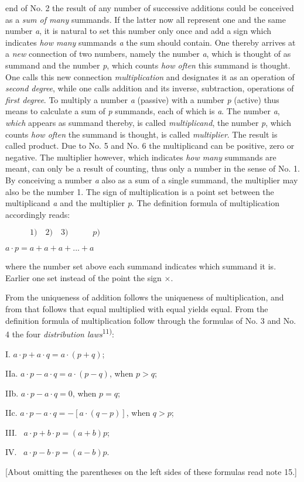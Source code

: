\thispagestyle{fancy}

\vspace{0.5cm}

end of No. 2 the result of any number of successive additions could be conceived as a \textit{sum of many} summands. If the latter now all represent one and the same number \textit{a}, it is natural to set this number only once and add a sign which indicates \textit{how many} summands \textit{a} the sum should contain. One thereby arrives at a \textit{new} connection of two numbers, namely the number \textit{a}, which is thought of as summand and the number \textit{p}, which counts \textit{how often} this summand is thought. One calls this new connection \textit{multiplication} and designates it as an operation of \textit{second degree}, while one calls addition and its inverse, subtraction, operations of \textit{first degree}. To multiply a number \textit{a} (passive) with a number \textit{p} (active) thus means to calculate a sum of \textit{p} summands, each of which is \textit{a}. The number \textit{a}, \textit{which} appears as summand thereby, is called \textit{multiplicand}, the number \textit{p}, which counts \textit{how often} the summand is thought, is called \textit{multiplier}. The result is called product. Due to No. 5 and No. 6 the multiplicand can be positive, zero or negative. The multiplier however, which indicates \textit{how many} summands are meant, can only be a result of counting, thus only a number in the sense of No. 1. By conceiving a number \textit{a} also as a sum of a single summand, the multiplier may also be the number 1. The sign of multiplication is a point set between the multiplicand \textit{a} and the multiplier \textit{p}. The definition formula of multiplication accordingly reads:

\vspace{-0.3cm}
\begin{center}
$ \quad \quad \quad 1) \quad  2) \quad 3) \quad \quad \quad p)$

$a \cdot p = a + a + a + ... + a$
\end{center}

where the number set above each summand indicates which summand it is. Earlier one set instead of the point the sign ×.

From the uniqueness of addition follows the uniqueness of multiplication, and from that follows that equal multiplied with equal yields equal. From the definition formula of multiplication follow through the formulas of No. 3 and No. 4 the four \textit{distribution laws}\textsuperscript{11)}:

I. \quad $a \cdot p + a \cdot q = a \cdot (p + q)$;

IIa. $a \cdot p - a \cdot q = a \cdot (p - q)$, when $p > q$;

IIb. $a \cdot p - a \cdot q = 0$, when $p = q$;

IIc. $a \cdot p - a \cdot q = -[a \cdot (q - p)]$, when $q > p$;

III. \, $a \cdot p + b \cdot p = (a + b)p$;

IV. \, $a \cdot p - b \cdot p = (a - b)p$. 

[About omitting the parentheses on the left sides of these formulas read note 15.]
